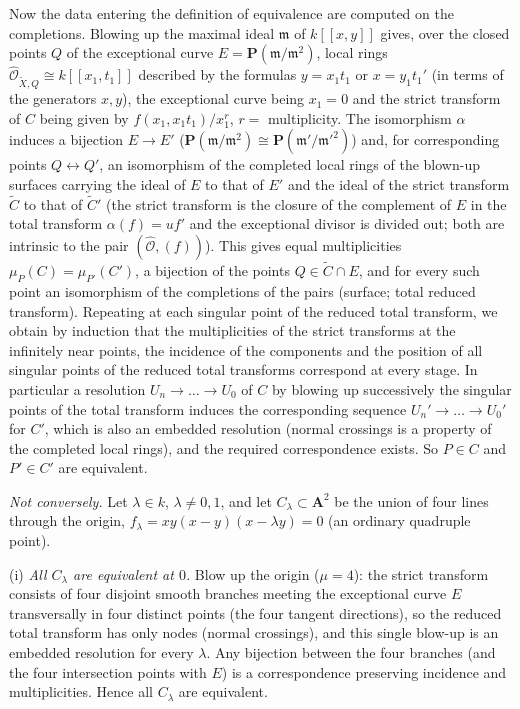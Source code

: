 \documentclass[11pt]{article}
\begin{document}
Now the data entering the definition of equivalence are computed on the completions. Blowing up the maximal ideal $\mathfrak m$ of $k[[x,y]]$ gives, over the closed points $Q$ of the exceptional curve $E=\mathbf P(\mathfrak m/\mathfrak m^2)$, local rings $\widehat{\mathcal O}_{\widetilde X,Q}\cong k[[x_1,t_1]]$ described by the formulas $y=x_1t_1$ or $x=y_1t_1'$ (in terms of the generators $x,y$), the exceptional curve being $x_1=0$ and the strict transform of $C$ being given by $f(x_1,x_1t_1)/x_1^{r}$, $r=$ multiplicity. The isomorphism $\alpha$ induces a bijection $E\to E'$ ($\mathbf P(\mathfrak m/\mathfrak m^2)\cong\mathbf P(\mathfrak m'/\mathfrak m'^2)$) and, for corresponding points $Q\leftrightarrow Q'$, an isomorphism of the completed local rings of the blown-up surfaces carrying the ideal of $E$ to that of $E'$ and the ideal of the strict transform $\widetilde C$ to that of $\widetilde C'$ (the strict transform is the closure of the complement of $E$ in the total transform $\alpha(f)=uf'$ and the exceptional divisor is divided out; both are intrinsic to the pair $(\widehat{\mathcal O},(f))$). This gives equal multiplicities $\mu_P(C)=\mu_{P'}(C')$, a bijection of the points $Q\in\widetilde C\cap E$, and for every such point an isomorphism of the completions of the pairs (surface; total reduced transform). Repeating at each singular point of the reduced total transform, we obtain by induction that the multiplicities of the strict transforms at the infinitely near points, the incidence of the components and the position of all singular points of the reduced total transforms correspond at every stage. In particular a resolution $U_n\to\dots\to U_0$ of $C$ by blowing up successively the singular points of the total transform induces the corresponding sequence $U_n'\to\dots\to U_0'$ for $C'$, which is also an embedded resolution (normal crossings is a property of the completed local rings), and the required correspondence exists. So $P\in C$ and $P'\in C'$ are equivalent.

\emph{Not conversely.} Let $\lambda\in k$, $\lambda\ne0,1$, and let $C_\lambda\subset\mathbf A^2$ be the union of four lines through the origin, $f_\lambda=xy(x-y)(x-\lambda y)=0$ (an ordinary quadruple point).

(i) \emph{All $C_\lambda$ are equivalent at $0$.} Blow up the origin ($\mu=4$): the strict transform consists of four disjoint smooth branches meeting the exceptional curve $E$ transversally in four distinct points (the four tangent directions), so the reduced total transform has only nodes (normal crossings), and this single blow-up is an embedded resolution for every $\lambda$. Any bijection between the four branches (and the four intersection points with $E$) is a correspondence preserving incidence and multiplicities. Hence all $C_\lambda$ are equivalent.
\end{document}
